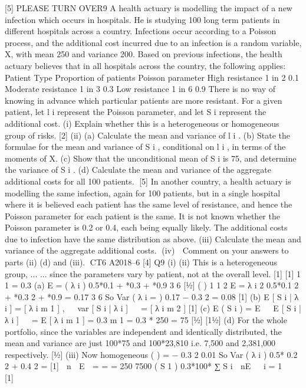 [5]
PLEASE TURN OVER9
A health actuary is modelling the impact of a new infection which occurs in hospitals.
He is studying 100 long term patients in different hospitals across a country.
Infections occur according to a Poisson process, and the additional cost incurred due
to an infection is a random variable, X, with mean 250 and variance 200.
Based on previous infections, the health actuary believes that in all hospitals across
the country, the following applies:
Patient Type
Proportion of patients Poisson parameter
High resistance 1 in 2 0.1
Moderate resistance 1 in 3 0.3
Low resistance 1 in 6 0.9
There is no way of knowing in advance which particular patients are more resistant.
For a given patient, let l i represent the Poisson parameter, and let S i represent the
additional cost.
(i) Explain whether this is a heterogeneous or homogeneous group of risks.
[2]
(ii) (a) Calculate the mean and variance of l i .
(b) State the formulae for the mean and variance of S i , conditional on l i , in
terms of the moments of X.
(c) Show that the unconditional mean of S i is 75, and determine the
variance of S i .
(d)
Calculate the mean and variance of the aggregate additional costs for
all 100 patients.
[5]
In another country, a health actuary is modelling the same infection, again for 100
patients, but in a single hospital where it is believed each patient has the same level
of resistance, and hence the Poisson parameter for each patient is the same. It is not
known whether the Poisson parameter is 0.2 or 0.4, each being equally likely. The
additional costs due to infection have the same distribution as above.
(iii) Calculate the mean and variance of the aggregate additional costs.
(iv)
 Comment on your answers to parts (ii) (d) and (iii).
CT6 A2018–6
[4]
Q9
(i)
(ii)
This is a heterogeneous group, ...
... since the parameters vary by patient, not at the overall level. [1]
[1]
1
1
= 0.3
(a) E =
( λ i ) 0.5*0.1 + *0.3 + *0.9
3
6 [1⁄2]
( )
1
1
2
E =
λ i 2 0.5*0.1 2 + *0.3 2 + *0.9
=
0.17
3
6
So Var ( λ i =
) 0.17 − 0.3 2 = 0.08 [1]
(b) E [ S i | λ i ] = [ λ i m 1 ] ,   var [ S i | λ i ]   =
[ λ i m 2 ] [1]
(c) E ( S i ) = E   E [ S i | λ i ]   = E [ λ i m 1 ] = 0.3 m 1 = 0.3 * 250 = 75 [1⁄2]
[11⁄2]
(d) For the whole portfolio, since the variables are independent and identically
distributed, the mean and variance are just 100*75 and 100*23,810 i.e. 7,500
and 2,381,000 respectively.
[1⁄2]
(iii)
Now homogeneous
(
)
=
− 0.3 2 0.01
So Var
( λ i ) 0.5* 0.2 2 + 0.4 2 = [1]
 n 
E  =
=
=
250 7500
( S 1 ) 0.3*100*
∑ S i  nE
  i = 1   [1]
